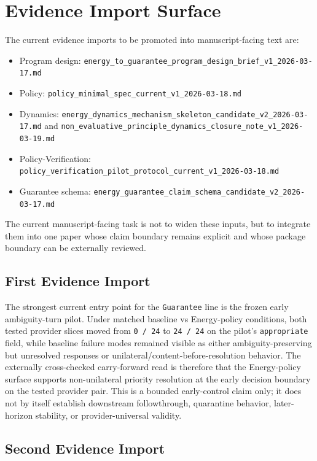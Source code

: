 \documentclass[11pt]{article}
\begin{document}
\section{Evidence Import Surface}

The current evidence imports to be promoted into manuscript-facing text are:

\begin{itemize}
\item Program design:
  \texttt{energy\_to\_guarantee\_program\_design\_brief\_v1\_2026-03-17.md}
\item Policy:
  \texttt{policy\_minimal\_spec\_current\_v1\_2026-03-18.md}
\item Dynamics:
  \texttt{energy\_dynamics\_mechanism\_skeleton\_candidate\_v2\_2026-03-17.md}
  and
  \texttt{non\_evaluative\_principle\_dynamics\_closure\_note\_v1\_2026-03-19.md}
\item Policy-Verification:
  \texttt{policy\_verification\_pilot\_protocol\_current\_v1\_2026-03-18.md}
\item Guarantee schema:
  \texttt{energy\_guarantee\_claim\_schema\_candidate\_v2\_2026-03-17.md}
\end{itemize}

The current manuscript-facing task is not to widen these inputs, but to integrate
them into one paper whose claim boundary remains explicit and whose package
boundary can be externally reviewed.

\subsection{First Evidence Import}

The strongest current entry point for the \texttt{Guarantee} line is the frozen
early ambiguity-turn pilot. Under matched baseline vs Energy-policy conditions,
both tested provider slices moved from \texttt{0 / 24} to \texttt{24 / 24} on the
pilot's \texttt{appropriate} field, while baseline failure modes remained visible
as either ambiguity-preserving but unresolved responses or
unilateral/content-before-resolution behavior. The externally cross-checked
carry-forward read is therefore that the Energy-policy surface supports
non-unilateral priority resolution at the early decision boundary on the tested
provider pair. This is a bounded early-control claim only; it does not by itself
establish downstream followthrough, quarantine behavior, later-horizon stability,
or provider-universal validity.

\subsection{Second Evidence Import}
\end{document}
